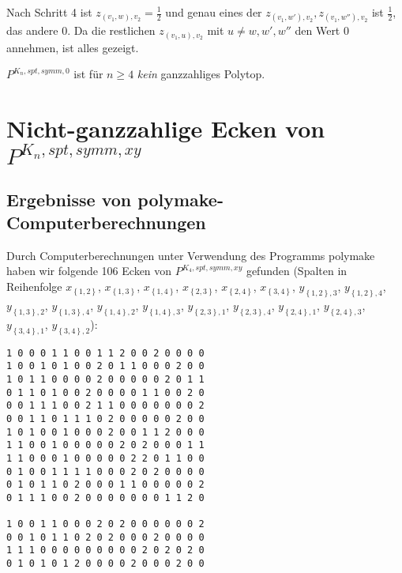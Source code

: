 \documentclass[10p,a4paper,BCOR = 12mm, DIV=15]{scrbook}
\begin{document}
{\begin{bew}
Nach Schritt 4 ist $z_{\left(v_1, w\right), v_2} = \frac{1}{2}$ und genau eines der $z_{\left(v_1, w'\right), v_2}, z_{\left(v_1, w''\right), v_2}$ ist $\frac{1}{2}$, das andere $0$. Da die restlichen $z_{\left(v_1, u\right), v_2}$ mit $u \neq w, w', w''$ den Wert $0$ annehmen, ist alles gezeigt.
\end{bew}

\begin{Kor}
$P^{K_n, spt, symm, 0}$ ist für $n\geq 4$ \emph{kein} ganzzahliges Polytop.
\end{Kor}

\section{Nicht-ganzzahlige Ecken von $P^{K_n, spt, symm, xy}$}

\subsection{Ergebnisse von polymake-Computerberechnungen}

\label{sec:ergebnis_computerberechnungen}

Durch Computerberechnungen unter Verwendung des Programms polymake \cite{polymake} haben wir folgende 106 Ecken von $P^{K_4, spt, symm, xy}$ gefunden (Spalten in Reihenfolge $x_{\left\{1, 2\right\}}$, $x_{\left\{1, 3\right\}}$, $x_{\left\{1, 4\right\}}$, $x_{\left\{2, 3\right\}}$, $x_{\left\{2, 4\right\}}$, $x_{\left\{3, 4\right\}}$, $y_{\left\{1, 2\right\}, 3}$, $y_{\left\{1, 2\right\}, 4}$, $y_{\left\{1, 3\right\}, 2}$, $y_{\left\{1, 3\right\}, 4}$, $y_{\left\{1, 4\right\}, 2}$, $y_{\left\{1, 4\right\}, 3}$, $y_{\left\{2, 3\right\}, 1}$, $y_{\left\{2, 3\right\}, 4}$, $y_{\left\{2, 4\right\}, 1}$, $y_{\left\{2, 4\right\}, 3}$, $y_{\left\{3, 4\right\}, 1}$, $y_{\left\{3, 4\right\}, 2}$):
\begin{verbatim}
1 0 0 0 1 1 0 0 1 1 2 0 0 2 0 0 0 0
1 0 0 1 0 1 0 0 2 0 1 1 0 0 0 2 0 0
1 0 1 1 0 0 0 0 2 0 0 0 0 0 2 0 1 1
0 1 1 0 1 0 0 2 0 0 0 0 1 1 0 0 2 0
0 0 1 1 1 0 0 2 1 1 0 0 0 0 0 0 0 2
0 0 1 1 0 1 1 1 0 2 0 0 0 0 0 2 0 0
1 0 1 0 0 1 0 0 0 2 0 0 1 1 2 0 0 0
1 1 0 0 1 0 0 0 0 0 2 0 2 0 0 0 1 1
1 1 0 0 0 1 0 0 0 0 0 2 2 0 1 1 0 0
0 1 0 0 1 1 1 1 0 0 0 2 0 2 0 0 0 0
0 1 0 1 1 0 2 0 0 0 1 1 0 0 0 0 0 2
0 1 1 1 0 0 2 0 0 0 0 0 0 0 1 1 2 0

1 0 0 1 1 0 0 0 2 0 2 0 0 0 0 0 0 2
0 0 1 0 1 1 0 2 0 2 0 0 0 2 0 0 0 0
1 1 1 0 0 0 0 0 0 0 0 0 2 0 2 0 2 0
0 1 0 1 0 1 2 0 0 0 0 2 0 0 0 2 0 0


\end{verbatim}}
\end{document}
